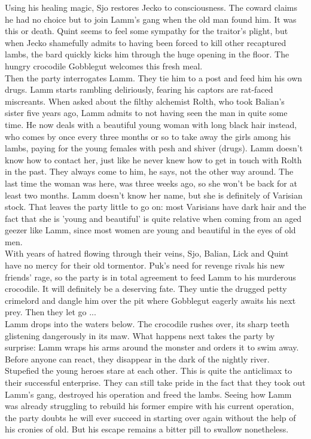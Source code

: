 Using his healing magic, Sjo restores Jecko to consciousness. The coward claims he had no choice but to join Lamm's gang when the old man found him. It was this or death. Quint seems to feel some sympathy for the traitor's plight, but when Jecko shamefully admits to having been forced to kill other recaptured lambs, the bard quickly kicks him through the huge opening in the floor. The hungry crocodile Gobblegut welcomes this fresh meal.\\

Then the party interrogates Lamm. They tie him to a post and feed him his own drugs. Lamm starts rambling deliriously, fearing his captors are rat-faced miscreants. When asked about the filthy alchemist Rolth, who took Balian's sister five years ago, Lamm admits to not having seen the man in quite some time. He now deals with a beautiful young woman with long black hair instead, who comes by once every three months or so to take away the girls among his lambs, paying for the young females with pesh and shiver (drugs). Lamm doesn't know how to contact her, just like he never knew how to get in touch with Rolth in the past. They always come to him, he says, not the other way around. The last time the woman was here, was three weeks ago, so she won't be back for at least two months. Lamm doesn't know her name, but she is definitely of Varisian stock. That leaves the party little to go on: most Varisians have dark hair and the fact that she is 'young and beautiful' is quite relative when coming from an aged geezer like Lamm, since most women are young and beautiful in the eyes of old men.\\

With years of hatred flowing through their veins, Sjo, Balian, Lick and Quint have no mercy for their old tormentor. Puk's need for revenge rivals his new friends' rage, so the party is in total agreement to feed Lamm to his murderous crocodile. It will definitely be a deserving fate. They untie the drugged petty crimelord and dangle him over the pit where Gobblegut eagerly awaits his next prey. Then they let go ...\\

Lamm drops into the waters below. The crocodile rushes over, its sharp teeth glistening dangerously in its maw. What happens next takes the party by surprise: Lamm wraps his arms around the monster and orders it to swim away. Before anyone can react, they disappear in the dark  of the nightly river. Stupefied the young heroes stare at each other. This is quite the anticlimax to their successful enterprise. They can still take pride in the fact that they took out Lamm's gang, destroyed his operation and freed the lambs. Seeing how Lamm was already struggling to rebuild his former empire with his current operation, the party doubts he will ever succeed in starting over again without the help of his cronies of old. But his escape remains a bitter pill to swallow nonetheless.\\

